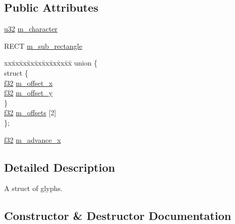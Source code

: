 \subsection*{Public Attributes}
\begin{DoxyCompactItemize}
\item 
\hyperlink{namespacemage_af2b398bf98eb10351f49cad73fe2cc73}{u32} \hyperlink{structmage_1_1_glyph_a69ce57c13d8a73174a0d88fd03b35fda}{m\+\_\+character}
\item 
R\+E\+CT \hyperlink{structmage_1_1_glyph_ac990dc92b5eebcc99da599f1a8d15bb4}{m\+\_\+sub\+\_\+rectangle}
\item 
\begin{tabbing}
xx\=xx\=xx\=xx\=xx\=xx\=xx\=xx\=xx\=\kill
union \{\\
\>struct \{\\
\>\>\hyperlink{namespacemage_a6a44ad388483959dc4dff9f2aef91431}{f32} \hyperlink{structmage_1_1_glyph_ae983fa77eaf0947aaffac8aa11b74518}{m\_offset\_x}\\
\>\>\hyperlink{namespacemage_a6a44ad388483959dc4dff9f2aef91431}{f32} \hyperlink{structmage_1_1_glyph_a86456531180ba716cd806e3f601e7aee}{m\_offset\_y}\\
\>\} \\
\>\hyperlink{namespacemage_a6a44ad388483959dc4dff9f2aef91431}{f32} \hyperlink{structmage_1_1_glyph_a378fa43d46f11b5963cad0500288494a}{m\_offsets} \mbox{[}2\mbox{]}\\
\}; \\

\end{tabbing}\item 
\hyperlink{namespacemage_a6a44ad388483959dc4dff9f2aef91431}{f32} \hyperlink{structmage_1_1_glyph_a226a77fa6bfc70b230cf0d5cc377195a}{m\+\_\+advance\+\_\+x}
\end{DoxyCompactItemize}


\subsection{Detailed Description}
A struct of glyphs. 

\subsection{Constructor \& Destructor Documentation}
\hypertarget{structmage_1_1_glyph_a86e6c795e2aaad853f54270c709969a6}{}\label{structmage_1_1_glyph_a86e6c795e2aaad853f54270c709969a6} 
